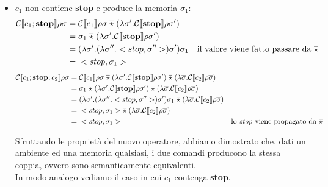     \begin{itemize}
        \item $c_1$ non contiene \textbf{stop} e produce la memoria $\sigma_1$:
            \begin{align*}
                \mathcal{C}\llbracket c_1;\mbox{\textbf{stop}} \rrbracket\rho\sigma =\;& \mathcal{C}\llbracket c_1 \rrbracket\rho\sigma\; \overline{\star}\; (\lambda\sigma'.\mathcal{C}\llbracket \mbox{\textbf{stop}} \rrbracket\rho\sigma')\\
                =\;& \sigma_1\; \overline{\star}\; (\lambda\sigma'.\mathcal{C}\llbracket \mbox{\textbf{stop}} \rrbracket\rho\sigma')\\
                =\;& (\lambda\sigma'.(\lambda\sigma''.<stop,\sigma''>)\sigma')\sigma_1 &\mbox{il valore viene fatto passare da $\overline{\star}$}\\
                =\;& <stop,\sigma_1>
            \end{align*}
            \begin{align*}
                \mathcal{C}\llbracket c_1;\mbox{\textbf{stop}};c_2 \rrbracket\rho\sigma =\;& \mathcal{C}\llbracket c_1 \rrbracket\rho\sigma\; \overline{\star}\; (\lambda\sigma'.\mathcal{C}\llbracket \mbox{\textbf{stop}} \rrbracket\rho\sigma')\; \overline{\star}\; (\lambda\overline{\sigma}.\mathcal{C}\llbracket c_2 \rrbracket\rho\overline{\sigma})\\
                =\;& \sigma_1\; \overline{\star}\; (\lambda\sigma'.\mathcal{C}\llbracket \mbox{\textbf{stop}} \rrbracket\rho\sigma')\; \overline{\star}\; (\lambda\overline{\sigma}.\mathcal{C}\llbracket c_2 \rrbracket\rho\overline{\sigma})\\
                =\;& (\lambda\sigma'.(\lambda\sigma''.<stop,\sigma''>)\sigma')\sigma_1\; \overline{\star}\; (\lambda\overline{\sigma}.\mathcal{C}\llbracket c_2 \rrbracket\rho\overline{\sigma})\\
                =\;& <stop,\sigma_1> \overline{\star}\; (\lambda\overline{\sigma}.\mathcal{C}\llbracket c_2 \rrbracket\rho\overline{\sigma})\\
                =\;& <stop,\sigma_1> &\mbox{lo \textit{stop} viene propagato da $\overline{\star}$}
            \end{align*}
            
            Sfruttando le proprietà del nuovo operatore, abbiamo dimostrato che, dati un ambiente ed una memoria qualsiasi, i due comandi producono la stessa coppia, ovvero sono semanticamente equivalenti.\\
            In modo analogo vediamo il caso in cui $c_1$ contenga \textbf{stop}.
            

\end{itemize}
